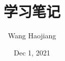 \documentclass[cn,10pt,math=newtx,color=blue]{elegantbook}
\title{学习笔记}
\author{Wang Haojiang}
\date{Dec 1, 2021}
\begin{document}
	\maketitle
	\frontmatter
	\tableofcontents
	\mainmatter
	
	
	
	
	
	

	\nocite{*} 
	\printbibliography
\end{document}
